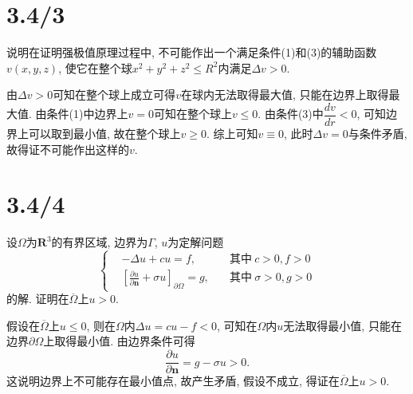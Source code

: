 \documentclass[11pt,a4paper]{article}
\begin{document}
\section{3.4/3}
\begin{problem}
说明在证明强极值原理过程中, 不可能作出一个满足条件(1)和(3)的辅助函数$v(x,y,z)$, 使它在整个球$x^2+y^2+z^2\leqslant R^2$内满足$\Delta v>0$.
\end{problem}

由$\Delta v>0$可知在整个球上成立可得$v$在球内无法取得最大值, 只能在边界上取得最大值. 由条件(1)中边界上$v=0$可知在整个球上$v\leqslant 0$. 由条件(3)中$\dfrac{dv}{dr}<0$, 可知边界上可以取到最小值, 故在整个球上$v\geqslant 0$. 综上可知$v\equiv 0$, 此时$\Delta v=0$与条件矛盾, 故得证不可能作出这样的$v$.

\section{3.4/4}
\begin{problem}
设$\Omega$为$\mathbf{R}^3$的有界区域, 边界为$\Gamma$, $u$为定解问题
$$\left\{\begin{aligned}
     & -\Delta u+cu=f,\quad                                                                 & \text{其中}\ c>0,f>0      \\
     & \left[\frac{\partial u}{\partial\mathbf{n}}+\sigma u\right]_{\partial\Omega}=g,\quad & \text{其中}\ \sigma>0,g>0
  \end{aligned}\right.$$
的解. 证明在$\overline{\Omega}$上$u>0$.
\end{problem}

假设在$\overline{\Omega}$上$u\leqslant0$, 则在$\Omega$内$\Delta u=cu-f<0$, 可知在$\Omega$内$u$无法取得最小值, 只能在边界$\partial\Omega$上取得最小值. 由边界条件可得
$$\frac{\partial u}{\partial\mathbf{n}}=g-\sigma u>0.$$
这说明边界上不可能存在最小值点, 故产生矛盾, 假设不成立, 得证在$\overline{\Omega}$上$u>0$.
\end{document}
